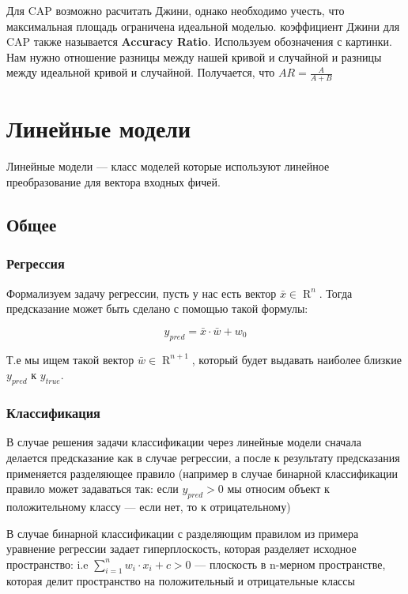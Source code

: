 \documentclass{article}
\begin{document}
    Для CAP возможно расчитать Джини, однако необходимо учесть, что максимальная площадь ограничена идеальной моделью. 
    коэффициент Джини для CAP также называется \textbf{Accuracy Ratio}. Используем обозначения с картинки. 
    Нам нужно отношение разницы между нашей кривой и случайной и разницы между идеальной кривой и случайной. 
    Получается, что $AR = \frac{A}{A + B}$

    \section{Линейные модели}

    Линейные модели --- класс моделей которые используют линейное преобразование для вектора входных фичей.

    \subsection{Общее}

    \subsubsection{Регрессия}

    Формализуем задачу регрессии, пусть у нас есть вектор $\bar{x} \in \operatorname{R}^{n}$.
    Тогда предсказание может быть сделано с помощью такой формулы:

    \begin{equation}
        y_{pred} = \bar{x} \cdot \bar{w} + w_{0}
    \end{equation}

    Т.е мы ищем такой вектор $\bar{w} \in \operatorname{R}^{n + 1}$, который будет выдавать наиболее близкие $y_{pred}$ к $y_{true}$.

    \subsubsection{Классификация}

    В случае решения задачи классификации через линейные модели сначала делается предсказание как в случае регрессии, а после
    к результату предсказания применяется разделяющее правило (например в случае бинарной классификации правило может задаваться так:
    если $y_{pred} > 0$ мы относим объект к положительному классу --- если нет, то к отрицательному)

    В случае бинарной классификации с разделяющим правилом из примера уравнение регрессии задает гиперплоскость,
    которая разделяет исходное пространство: i.e $\sum_{i = 1}^{n}{w_{i} \cdot x_{i}} + c > 0$ --- плоскость в n-мерном пространстве,
    которая делит пространство на положительный и отрицательные классы
\end{document}
